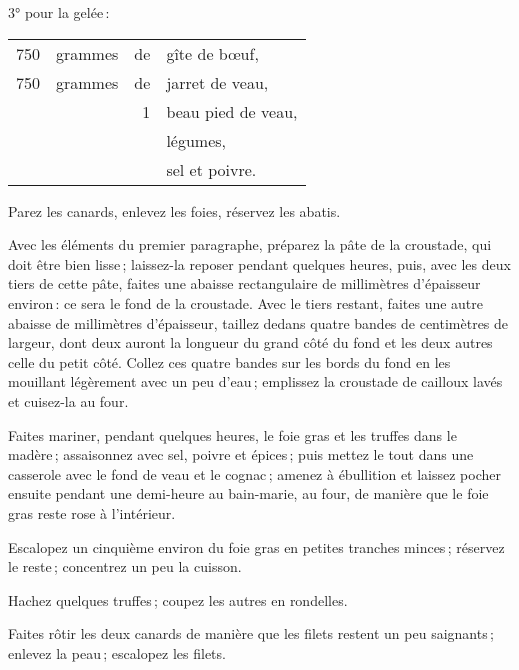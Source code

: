 3° pour la gelée :

\medskip

\footnotesize
\begin{longtable}{rrrp{16em}}
    750 & grammes & de & gîte de bœuf,                                                                    \\
    750 & grammes & de & jarret de veau,                                                                  \\
        &         &  1 & beau pied de veau,                                                               \\
        &         &    & légumes,                                                                         \\
        &         &    & sel et poivre.                                                                   \\
\end{longtable}
\normalsize

Parez les canards, enlevez les foies, réservez les abatis.

Avec les éléments du premier paragraphe, préparez la pâte de la croustade, qui
doit être bien lisse ; laissez-la reposer pendant quelques heures, puis, avec
les deux tiers de cette pâte, faites une abaisse rectangulaire de {\mmm} millimètres
d'épaisseur environ : ce sera le fond de la croustade. Avec le tiers restant,
faites une autre abaisse de {\mmm} millimètres d'épaisseur, taillez dedans quatre
bandes de {\mmm} centimètres de largeur, dont deux auront la longueur du grand côté
du fond et les deux autres celle du petit côté. Collez ces quatre bandes sur
les bords du fond en les mouillant légèrement avec un peu d’eau ; emplissez la
croustade de cailloux lavés et cuisez-la au four.

Faites mariner, pendant quelques heures, le foie gras et les truffes dans le
madère ; assaisonnez avec sel, poivre et épices ; puis mettez le tout dans une
casserole avec le fond de veau et le cognac ; amenez à ébullition et laissez
pocher ensuite pendant une demi-heure au bain-marie, au four, de manière que le
foie gras reste rose à l'intérieur.

Escalopez un cinquième environ du foie gras en petites tranches minces ;
réservez le reste ; concentrez un peu la cuisson.

Hachez quelques truffes ; coupez les autres en rondelles.

Faites rôtir les deux canards de manière que les filets restent un peu
saignants ; enlevez la peau ; escalopez les filets.

